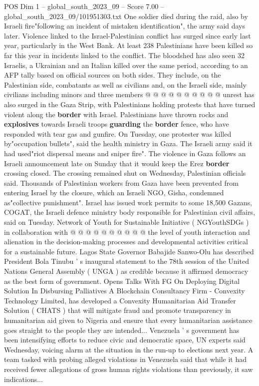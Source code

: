 \begin{textsample}{POS Dim 1 – global\_south\_2023\_09 – Score 7.00 – global\_south\_2023\_09/101951303.txt}
One soldier died during the raid, also by Israeli fire"following an incident of mistaken identification", the army said days later.
Violence linked to the Israel-Palestinian conflict has surged since early last year, particularly in the West Bank.
At least 238 Palestinians have been killed so far this year in incidents linked to the conflict.
The bloodshed has also seen 32 Israelis, a Ukrainian and an Italian killed over the same period, according to an AFP tally based on official sources on both sides.
They include, on the Palestinian side, combatants as well as civilians and, on the Israeli side, mainly civilians including minors and three members @ @ @ @ @ @ @ @ @ @ unrest has also surged in the Gaza Strip, with Palestinians holding protests that have turned violent along the \textbf{border} with Israel.
Palestinians have thrown rocks and \textbf{explosives} towards Israeli troops \textbf{guarding} the \textbf{border} fence, who have responded with tear gas and gunfire.
On Tuesday, one protester was killed by"occupation bullets", said the health ministry in Gaza.
The Israeli army said it had used"riot dispersal means and sniper fire".
The violence in Gaza follows an Israeli announcement late on Sunday that it would keep the Erez \textbf{border} crossing closed.
The crossing remained shut on Wednesday, Palestinian officials said.
Thousands of Palestinian workers from Gaza have been prevented from entering Israel by the closure, which an Israeli NGO, Gisha, condemned as"collective punishment".
Israel has issued work permits to some 18,500 Gazans, COGAT, the Israeli defence ministry body responsible for Palestinian civil affairs, said on Tuesday.
Network of Youth for Sustainable Initiative ( NGYouthSDGs ) in collaboration with @ @ @ @ @ @ @ @ @ @ the level of youth interaction and alienation in the decision-making processes and developmental activities critical for a sustainable future.
Lagos State Governor Babajide Sanwo-Olu has described President Bola Tinubu ' s inaugural statement to the 78th session of the United Nations General Assembly ( UNGA ) as credible because it affirmed democracy as the best form of government.
Opens Talks With FG On Deploying Digital Solution In Disbursing Palliatives A Blockchain Consultancy Firm - Convexity Technology Limited, has developed a Convexity Humanitarian Aid Transfer Solution ( CHATS ) that will mitigate fraud and promote transparency in humanitarian aid given to Nigeria and ensure that every humanitarian assistance goes straight to the people they are intended...
Venezuela ' s government has been intensifying efforts to reduce civic and democratic space, UN experts said Wednesday, voicing alarm at the situation in the run-up to elections next year.
A team tasked with probing alleged violations in Venezuela said that while it had received fewer allegations of gross human rights violations than previously, it saw indications...

\end{textsample}
